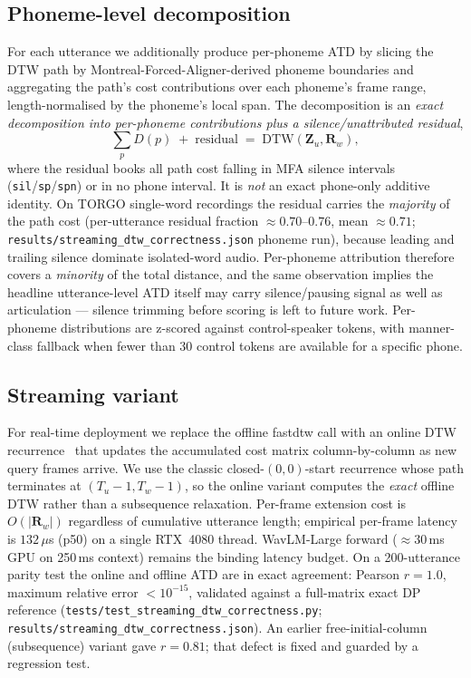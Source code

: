 \subsection{Phoneme-level decomposition}
For each utterance we additionally produce per-phoneme ATD by slicing the
DTW path by Montreal-Forced-Aligner-derived phoneme boundaries and
aggregating the path's cost contributions over each phoneme's frame range,
length-normalised by the phoneme's local span. The decomposition is an
\emph{exact decomposition into per-phoneme contributions plus a
silence/unattributed residual},
\begin{equation}
\sum_p D(p) \;+\; \mathrm{residual} \;=\; \mathrm{DTW}(\mathbf{Z}_u, \mathbf{R}_w),
\end{equation}
where the residual books all path cost falling in MFA silence intervals
(\texttt{sil}/\texttt{sp}/\texttt{spn}) or in no phone interval. It is
\emph{not} an exact phone-only additive identity. On TORGO single-word
recordings the residual carries the \emph{majority} of the path cost
(per-utterance residual fraction $\approx 0.70$--$0.76$, mean $\approx
0.71$; \texttt{results/streaming\_dtw\_correctness.json} phoneme run),
because leading and trailing silence dominate isolated-word audio.
Per-phoneme attribution therefore covers a \emph{minority} of the total
distance, and the same observation implies the headline utterance-level
ATD itself may carry silence/pausing signal as well as articulation ---
silence trimming before scoring is left to future work. Per-phoneme
distributions are z-scored against control-speaker tokens, with
manner-class fallback when fewer than 30 control tokens are available for
a specific phone.

\subsection{Streaming variant}
For real-time deployment we replace the offline fastdtw call with an
online DTW recurrence~\cite{Mueller2007SubseqDTW,
Rakthanmanon2012UCRSuite} that updates the accumulated cost matrix
column-by-column as new query frames arrive. We use the classic
closed-$(0,0)$-start recurrence whose path terminates at
$(T_u{-}1, T_w{-}1)$, so the online variant computes the \emph{exact}
offline DTW rather than a subsequence relaxation. Per-frame extension
cost is $O(|\mathbf{R}_w|)$ regardless of cumulative utterance length;
empirical per-frame latency is $132$\,$\mu$s (p50) on a single RTX~4080
thread. WavLM-Large forward ($\approx 30$\,ms GPU on 250\,ms context)
remains the binding latency budget. On a 200-utterance parity test the
online and offline ATD are in exact agreement: Pearson $r = 1.0$, maximum
relative error $< 10^{-15}$, validated against a full-matrix exact DP
reference (\texttt{tests/test\_streaming\_dtw\_correctness.py};
\texttt{results/streaming\_dtw\_correctness.json}). An earlier
free-initial-column (subsequence) variant gave $r = 0.81$; that defect is
fixed and guarded by a regression test.

